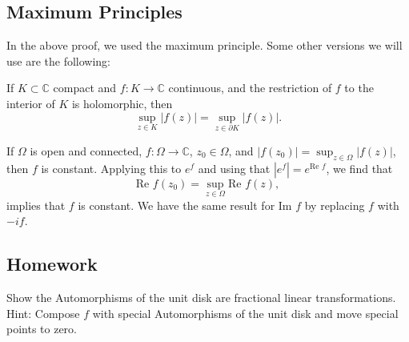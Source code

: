\documentclass[12pt]{scrartcl}
\newcommand{\C}{\mathbb C}
\begin{document}
\subsection{Maximum Principles} 
In the above proof, we used the maximum principle.  Some other versions we will use are the following:
 
 If $K \subset \C$ compact and $f:K \to \C$ continuous, and the restriction of $f$ to the interior of $K$ is holomorphic, then 
 $$\sup_{z \in K} |f(z)| = \sup_{z \in \partial K} |f(z)|.$$
 
If $\Omega$ is open and connected, $f: \Omega \to \C$, $z_0 \in \Omega$, and $|f(z_0)| = \sup_{z \in \Omega} |f(z)|$, then $f$ is constant.  Applying this to $e^f$ and using that $|e^f| = e^{\text{Re }f}$, we find that 
$$\text{Re }f(z_0) = \sup_{z \in \Omega} \text{Re }f(z),$$
implies that $f$
 is constant.   We have the same result for $\text{Im }f$ by replacing $f$ with $-if$.  
 
 \subsection{Homework}
Show the Automorphisms of the unit disk are fractional linear transformations.  Hint: Compose $f$ with special Automorphisms of the unit disk and move special points to zero.  
 
\end{document}
